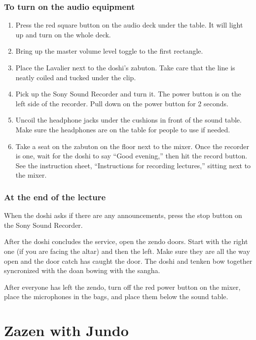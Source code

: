 \documentclass{chantbook}
\newcommand{\bodyfont}{\fontsize{14pt}{16pt}\selectfont}
\begin{document}
\subsection*{To turn on the audio equipment}
\begin{enumerate}
\item Press the red square button on the audio deck under the table. It will
light up and turn on the whole deck.
\item Bring up the master volume level toggle to the first rectangle.
\item Place the Lavalier next to the doshi's zabuton. Take care that the line
is neatly coiled and tucked under the clip.
\item Pick up the Sony Sound Recorder and turn it. The power button is on the
left side of the recorder. Pull down on the power button for 2 seconds.
\item Uncoil the headphone jacks under the cushions in front of the sound
table. Make sure the headphones are on the table for people to use if needed.
\item Take a seat on the zabuton on the floor next to the mixer. Once the
recorder is one, wait for the doshi to say ``Good evening,'' then hit the
record button. See the instruction sheet, ``Instructions for recording
lectures,'' sitting next to the mixer.
\end{enumerate}

\subsection*{At the end of the lecture}
When the doshi asks if there are any announcements, press the stop button on the
Sony Sound Recorder.

After the doshi concludes the service, open the zendo doors. Start with the
right one (if you are facing the altar) and then the left. Make sure they are
all the way open and the door catch has caught the door. The doshi and tenken
bow together syncronized with the doan bowing with the sangha.

After everyone has left the zendo, turn off the red power button on the mixer,
place the microphones in the bags, and place them below the sound table.

\bodyfont

\chapter{Zazen with Jundo}
\end{document}
